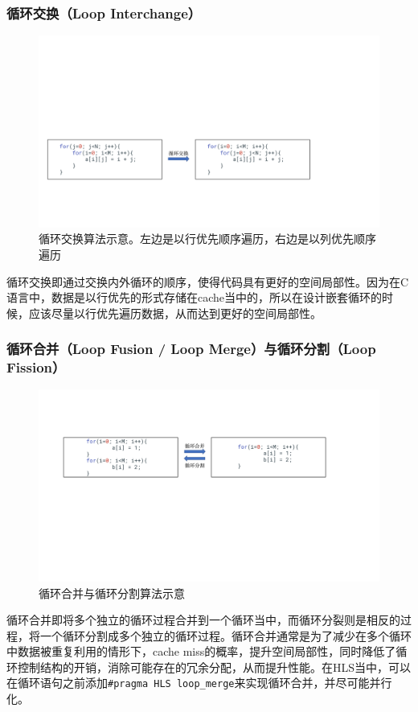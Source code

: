 \subsubsection{循环交换（Loop Interchange）}
\begin{figure}[htbp]
    \centering
    \includegraphics[width=\linewidth]{figures/loop interchange.pdf}
    \caption{循环交换算法示意。左边是以行优先顺序遍历，右边是以列优先顺序遍历}
    \label{fig:loop_interchange}
\end{figure}
循环交换即通过交换内外循环的顺序，使得代码具有更好的空间局部性。因为在C语言中，数据是以行优先的形式存储在cache当中的，所以在设计嵌套循环的时候，应该尽量以行优先遍历数据，从而达到更好的空间局部性。
\subsubsection{循环合并（Loop Fusion / Loop Merge）与循环分割（Loop Fission）}
\begin{figure}[htbp]
    \centering
    \includegraphics[width=\linewidth]{figures/loop fusion.pdf}
    \caption{循环合并与循环分割算法示意}
    \label{fig:loop_fusion}
\end{figure}
循环合并即将多个独立的循环过程合并到一个循环当中，而循环分裂则是相反的过程，将一个循环分割成多个独立的循环过程。循环合并通常是为了减少在多个循环中数据被重复利用的情形下，cache miss的概率，提升空间局部性，同时降低了循环控制结构的开销，消除可能存在的冗余分配，从而提升性能。在HLS当中，可以在循环语句之前添加\verb|#pragma HLS loop_merge|来实现循环合并，并尽可能并行化。
